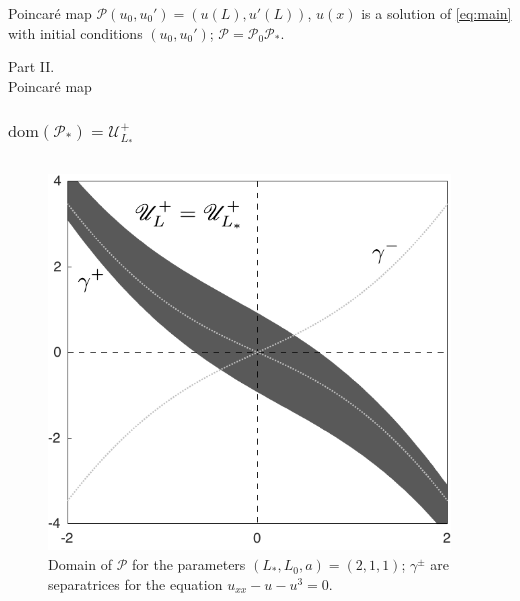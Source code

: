 \documentclass [10pt] {beamer}
\begin{document}
\begin{frame}
	Poincar\'e map $\mathcal{P}(u_0, u_0') = (u(L), u'(L))$, $u(x)$ is a solution of \eqref{eq:main} with initial conditions $(u_0, u_0')$; $\mathcal{P} = \mathcal{P}_0 \mathcal{P}_*$.
\end{frame}

\begin{frame}
	\begin{center}
		{\Huge Part II.} \\[10pt] {\LARGE Poincar\'e map}
	\end{center}
\end{frame}

\begin{frame}
	\frametitle{$\textrm{dom}(\mathcal{P_*}) = \mathscr{U}_{L_*}^+$}
	\begin{columns}[T]
		\begin{column}{.5\textwidth}
			\begin{figure}
			\includegraphics[width = 1\textwidth]{pic/h-strips-step-1.pdf}
			\caption{Domain of $\mathcal{P}$ for the parameters $(L_*, L_0, a) = (2, 1, 1)$; $\gamma^{\pm}$ are separatrices for the equation $u_{xx} - u - u^3 = 0$.}
			\label{pic:h-striprs-step-1}
			\end{figure}
		\end{column}
		\begin{column}{.5\textwidth}

\end{column}
\end{columns}
\end{frame}
\end{document}
